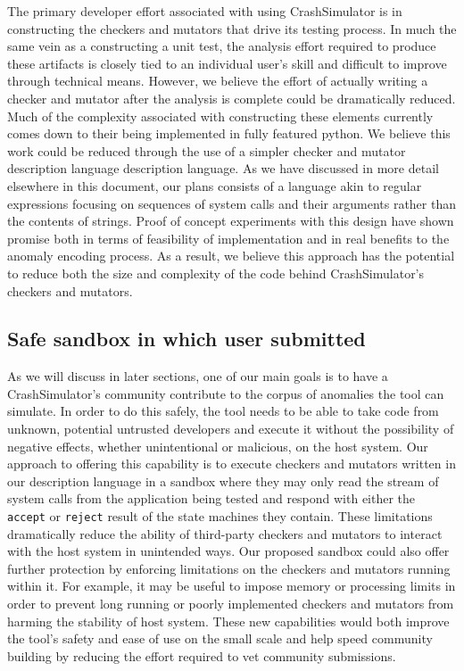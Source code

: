 \documentclass[twocolumn]{article}
\begin{document}
The primary developer effort associated with using CrashSimulator is in
constructing the checkers and mutators that drive its testing process.  In
much the same vein as a constructing a unit test, the analysis effort
required to produce these artifacts is closely tied to an individual user's
skill and difficult to improve through technical means.  However, we
believe the effort of actually writing a checker and mutator after the
analysis is complete could be dramatically reduced.  Much of the complexity
associated with constructing these elements currently comes down to their
being implemented in fully featured python.  We believe this work could be
reduced through the use of a simpler checker and mutator description language
description language.  As we have discussed in more detail
elsewhere in this document, our plans consists of a language akin to
regular expressions focusing on sequences of system calls and their
arguments rather than the contents of strings.  Proof of concept
experiments with this design have shown promise both in terms of
feasibility of implementation and in real benefits to the anomaly encoding
process.  As a result, we believe this approach has the potential to reduce
both the size and complexity of the code behind CrashSimulator's checkers
and mutators.

\subsection{ Safe sandbox in which user submitted}

As we will discuss in later sections, one of our main goals is to have a
CrashSimulator's community contribute to the corpus of anomalies the tool
can simulate.  In order to do this safely, the tool needs to be able to
take code from unknown, potential untrusted developers and execute it
without the possibility of negative effects, whether unintentional or
malicious, on the host system.  Our approach to offering this capability is
to execute checkers and mutators written in our description language in a
sandbox where they may only read the stream of system calls
from the application being tested and respond with either the {\tt accept} or
{\tt reject} result of the state machines they contain.  These limitations
dramatically reduce the ability of third-party checkers and mutators to
interact with the host system in unintended ways.
Our proposed sandbox could also offer further protection by enforcing
limitations on the checkers and mutators running within it.  For example,
it may be useful to impose memory or processing limits in order to prevent
long running or poorly implemented checkers and mutators from harming the
stability of host system.  These new capabilities would both improve the
tool's safety and ease of use on the small scale and help speed
community building by reducing the effort required to vet
community submissions.
\end{document}
